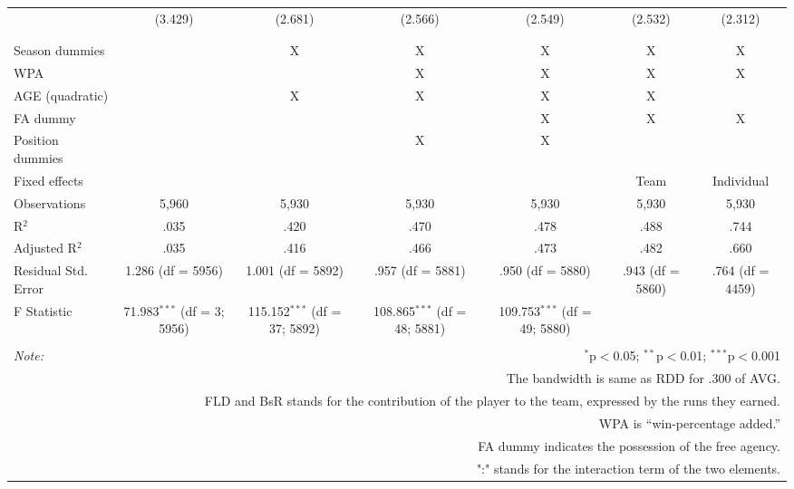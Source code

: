 \begin{table}[H]
\begin{tabular}{@{\extracolsep{-15pt}}lcccccc}
  & (3.429) & (2.681) & (2.566) & (2.549) & (2.532) & (2.312) \\
  & & & & & & \\
\hline \\[-1.8ex]
Season dummies &  & X & X & X & X & X \\
WPA & & & X & X & X & X  \\
AGE (quadratic) &  & X & X & X & X &  \\
FA dummy &  &  &  & X & X & X \\
Position dummies &  &  & X & X &  &  \\
Fixed effects &  &  &  &  & Team & Individual \\
Observations & 5,960 & 5,930 & 5,930 & 5,930 & 5,930 & 5,930 \\
R$^{2}$ & .035 & .420 & .470 & .478 & .488 & .744 \\
Adjusted R$^{2}$ & .035 & .416 & .466 & .473 & .482 & .660 \\
Residual Std. Error & 1.286 (df = 5956) & 1.001 (df = 5892) & .957 (df = 5881) & .950 (df = 5880) & .943 (df = 5860) & .764 (df = 4459) \\
F Statistic & 71.983$^{***}$ (df = 3; 5956) & 115.152$^{***}$ (df = 37; 5892) & 108.865$^{***}$ (df = 48; 5881) & 109.753$^{***}$ (df = 49; 5880) &  &  \\
\hline
\hline \\[-1.8ex]
\textit{Note:}  & \multicolumn{6}{r}{$^{*}$p$<$0.05; $^{**}$p$<$0.01; $^{***}$p$<$0.001} \\
& \multicolumn{6}{r}{The bandwidth is same as RDD for .300 of AVG.} \\
& \multicolumn{6}{r}{FLD and BsR stands for the contribution of the player to the team, expressed by the runs they earned.} \\
& \multicolumn{6}{r}{WPA is ``win-percentage added.''} \\
& \multicolumn{6}{r}{FA dummy indicates the possession of the free agency.}\\
& \multicolumn{6}{r}{":" stands for the interaction term of the two elements.} \\
\end{tabular}
\end{table}
